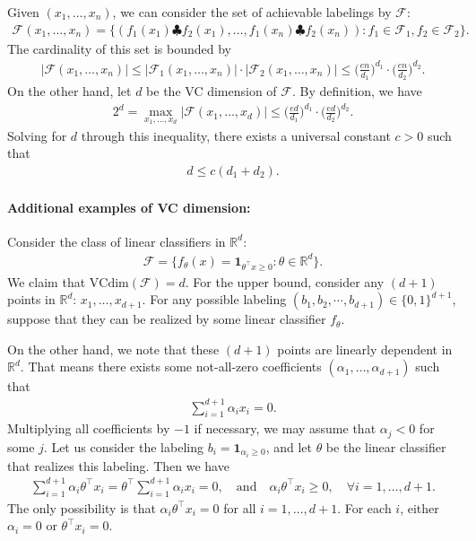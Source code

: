 \documentclass[11pt,letterpaper]{article}
\numberwithin{theorem}{lecture}
\numberwithin{proposition}{lecture}
\numberwithin{lemma}{lecture}
\numberwithin{claim}{lecture}
\numberwithin{corollary}{lecture}
\numberwithin{definition}{lecture}
\numberwithin{conjecture}{lecture}
\numberwithin{remark}{lecture}
\numberwithin{example}{lecture}
\numberwithin{equation}{lecture}
\begin{document}
Given $(x_1, \ldots, x_n)$, we can consider the set of achievable labelings by $\mathcal{F}$:
\begin{align*}
  \mathcal{F} (x_1, \ldots, x_n) = \{(f_1 (x_1) \clubsuit f_2 (x_1), \ldots, f_1 (x_n) \clubsuit f_2 (x_n)): f_1 \in \mathcal{F}_1, f_2 \in \mathcal{F}_2\}.
\end{align*}
The cardinality of this set is bounded by
\begin{align*}
  |\mathcal{F} (x_1, \ldots, x_n)| \leq |\mathcal{F}_1 (x_1, \ldots, x_n)| \cdot |\mathcal{F}_2 (x_1, \ldots, x_n)| \leq \Big( \frac{e n}{d_1} \Big)^{d_1} \cdot \Big( \frac{e n}{d_2} \Big)^{d_2}.
\end{align*}
On the other hand, let $d$ be the VC dimension of $\mathcal{F}$. By definition, we have
\begin{align*}
  2^d = \max_{x_1, \ldots, x_d} |\mathcal{F} (x_1, \ldots, x_d)| \leq \Big( \frac{e d}{d_1} \Big)^{d_1} \cdot \Big( \frac{e d}{d_2} \Big)^{d_2}.
\end{align*}
Solving for $d$ through this inequality, there exists a universal constant $c > 0$ such that
\begin{align*}
  d \leq c (d_1 + d_2).
\end{align*}


\paragraph{Additional examples of VC dimension:} Consider the class of linear classifiers in $\mathbb{R}^d$:
\begin{align*}
  \mathcal{F} = \Big\{f_\theta (x) = \bm{1}_{\theta^\top x \geq 0}: \theta \in \mathbb{R}^d\Big\}.
\end{align*}
We claim that $\text{VCdim} (\mathcal{F}) = d$. For the upper bound, consider any $(d + 1)$ points in $\mathbb{R}^d$: $x_1, \ldots, x_{d + 1}$. For any possible labeling $(b_1, b_2, \cdots, b_{d + 1}) \in \{0, 1\}^{d + 1}$, suppose that they can be realized by some linear classifier $f_\theta$.

On the other hand, we note that these $(d + 1)$ points are linearly dependent in $\mathbb{R}^d$. That means there exists some not-all-zero coefficients $(\alpha_1, \ldots, \alpha_{d + 1})$ such that
\begin{align*}
  \sum_{i = 1}^{d + 1} \alpha_i x_i = 0.
\end{align*}
Multiplying all coefficients by $-1$ if necessary, we may assume that $\alpha_j < 0$ for some $j$. Let us consider the labeling $b_i = \bm{1}_{\alpha_i \geq 0}$, and let $\theta$ be the linear classifier that realizes this labeling. Then we have
\begin{align*}
  \sum_{i = 1}^{d + 1} \alpha_i \theta^\top x_i = \theta^\top \sum_{i = 1}^{d + 1} \alpha_i x_i = 0, \quad \text{and} \quad \alpha_i \theta^\top x_i \geq 0, \quad \forall i = 1, \ldots, d + 1.
\end{align*}
The only possibility is that $\alpha_i \theta^\top x_i = 0$ for all $i = 1, \ldots, d + 1$. For each $i$, either $\alpha_i = 0$ or $\theta^\top x_i = 0$.
\end{document}
